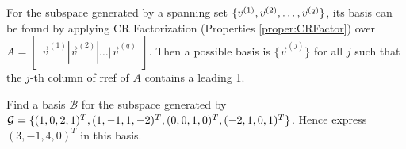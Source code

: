 \begin{proper}
\label{proper:findgenbasis}
For the subspace generated by a spanning set $\{\vec{v}^{(1)}, \vec{v}^{(2)}, \ldots, \\ \vec{v}^{(q)}\}$, its basis can be found by applying CR Factorization (Properties \ref{proper:CRFactor}) over $A = \begin{bmatrix}
\vec{v}^{(1)}|\vec{v}^{(2)}|\ldots|\vec{v}^{(q)}    
\end{bmatrix}$. Then a possible basis is $\{\vec{v}^{(j)}\}$ for all $j$ such that the $j$-th column of rref of $A$ contains a leading 1.
\end{proper}

\begin{exmp}
\label{exmp:gentrimbasis}
Find a basis $\mathcal{B}$ for the subspace generated by $\mathcal{G} = \{(1,0,2,1)^T, \\ (1,-1,1,-2)^T, (0,0,1,0)^T, (-2,1,0,1)^T\}$. Hence express $(3,-1,4,0)^T$ in this basis. 
\end{exmp}
